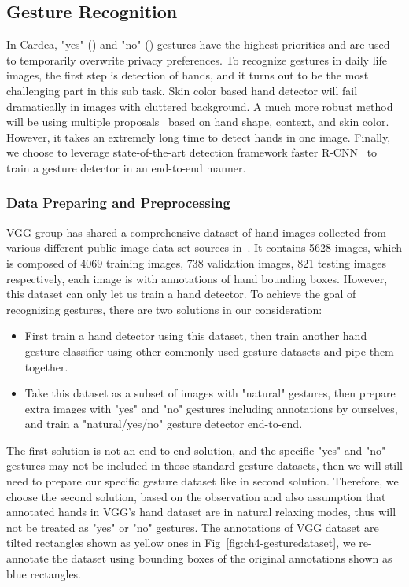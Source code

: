 \subsection{Gesture Recognition}
In Cardea, "yes" () and "no" () gestures have the highest priorities and are used to temporarily overwrite privacy preferences. To recognize gestures in daily life images, the first step is detection of hands, and it turns out to be the most challenging part in this sub task. Skin color based hand detector will fail dramatically in images with cluttered background. A much more robust method will be using multiple proposals~\cite{mittal2011hand} based on hand shape, context, and skin color. However, it takes an extremely long time to detect hands in one image. Finally, we choose to leverage state-of-the-art detection framework faster R-CNN~\cite{ren2015faster} to train a gesture detector in an end-to-end manner.

\subsubsection{Data Preparing and Preprocessing}


VGG group has shared a comprehensive dataset of hand images collected from various different public image data set sources in~\cite{mittal2011hand, links:vgghanddataset}. It contains 5628 images, which is composed of 4069 training images, 738 validation images, 821 testing images respectively, each image is with annotations of hand bounding boxes. However, this dataset can only let us train a hand detector. To achieve the goal of recognizing gestures, there are two solutions in our consideration:

\begin{itemize}
\item First train a hand detector using this dataset, then train another hand gesture classifier using other commonly used gesture datasets and pipe them together.
\item Take this dataset as a subset of images with "natural" gestures, then prepare extra images with "yes" and "no" gestures including annotations by ourselves, and train a "natural/yes/no" gesture detector end-to-end.
\end{itemize}

The first solution is not an end-to-end solution, and the specific "yes" and "no" gestures may not be included in those standard gesture datasets, then we will still need to prepare our specific gesture dataset like in second solution. Therefore, we choose the second solution, based on the observation and also assumption that annotated hands in VGG's hand dataset are in natural relaxing modes, thus will not be treated as "yes" or "no" gestures. The annotations of VGG dataset are tilted rectangles shown as yellow ones in Fig~\ref{fig:ch4-gesturedataset}, we re-annotate the dataset using bounding boxes of the original annotations shown as blue rectangles.

